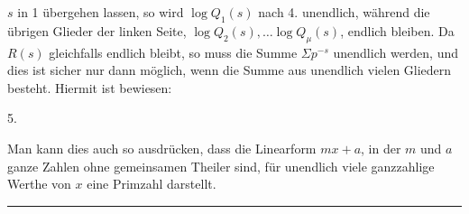 $s$ in 1 übergehen lassen, so wird $\log Q_1(s)$ nach 4. unendlich, während die übrigen Glieder der linken Seite, $\log Q_2(s), \ldots \log Q_\mu(s)$, endlich bleiben. Da $R(s)$ gleichfalls endlich bleibt, so muss die Summe $\Sigma p^{-s}$ unendlich werden, und dies ist sicher nur dann möglich, wenn die Summe aus unendlich vielen Gliedern besteht. Hiermit ist bewiesen:

5. 

Man kann dies auch so ausdrücken, dass die Linearform $mx + a$, in der $m$ und $a$ ganze Zahlen ohne gemeinsamen Theiler sind, für unendlich viele ganzzahlige Werthe von $x$ eine Primzahl darstellt.

\begin{center}
\rule{4cm}{0.4pt}
\end{center}

